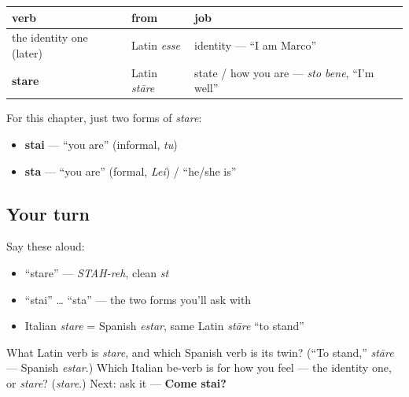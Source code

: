 \begin{grammarlens}[title={Grammar Lens: the two be-verbs, and the two forms you need}]
\noindent
\begin{tabularx}{\linewidth}{@{}>{\raggedright\arraybackslash}X>{\raggedright\arraybackslash}X>{\raggedright\arraybackslash}X@{}}
\toprule
\textbf{verb} & \textbf{from} & \textbf{job} \\
\midrule
the identity one (later) & Latin \emph{esse} & identity — \textquotedblleft{}I am Marco\textquotedblright{} \\
\textbf{stare} & Latin \emph{stāre} & state / how you are — \emph{sto bene}, \textquotedblleft{}I'm well\textquotedblright{} \\
\bottomrule
\end{tabularx}

For this chapter, just two forms of \emph{stare}:

\begin{itemize}
\raggedright
  \item \textbf{stai} — \textquotedblleft{}you are\textquotedblright{} (informal, \emph{tu})
  \item \textbf{sta} — \textquotedblleft{}you are\textquotedblright{} (formal, \emph{Lei}) / \textquotedblleft{}he/she is\textquotedblright{}
\end{itemize}
\end{grammarlens}

\subsection*{Your turn}
Say these aloud:

\begin{itemize}
\raggedright
  \item \textquotedblleft{}stare\textquotedblright{} — \emph{STAH-reh}, clean \emph{st}
  \item \textquotedblleft{}stai\textquotedblright{} … \textquotedblleft{}sta\textquotedblright{} — the two forms you'll ask with
  \item Italian \emph{stare} = Spanish \emph{estar}, same Latin \emph{stāre} \textquotedblleft{}to stand\textquotedblright{}
\end{itemize}

\begin{tcolorbox}[breakable,colback=teal!4,colframe=teal!35!black,title={Before you move on}]
What Latin verb is \emph{stare}, and which Spanish verb is its twin? (\textquotedblleft{}To stand,\textquotedblright{} \emph{stāre} — Spanish \emph{estar}.) Which Italian be-verb is for how you feel — the identity one, or \emph{stare}? (\emph{stare}.) Next: ask it — \textbf{Come stai?}
\end{tcolorbox}
